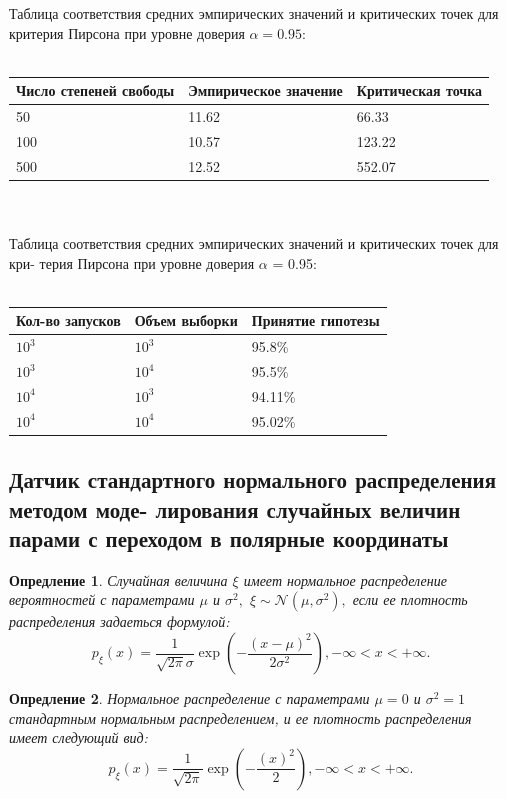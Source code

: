 \documentclass[11pt]{article}
\newtheorem{definition}{Опредление}
\numberwithin{equation}{section}
\begin{document}
Таблица соответствия средних эмпирических значений и критических точек для критерия Пирсона при уровне доверия $\alpha = 0.95$:
\\
\\
\begin{tabular}{ | l | l | l | }
  \hline
  Число степеней свободы & Эмпирическое значение & Критическая точка\\ \hline
  50 & 11.62 & 66.33 \\ \hline
  100 & 10.57 & 123.22  \\ \hline
  500 & 12.52 & 552.07 \\ 
  \hline
\end{tabular}
\\
\\
Таблица соответствия средних эмпирических значений и критических точек для кри- терия Пирсона при уровне доверия $\alpha$ = 0.95:
\\
\\
\begin{tabular}{ | l | l | l | }
  \hline
  Кол-во запусков & Объем выборки & Принятие гипотезы\\ \hline
  $10^3$ & $10^3$ & 95.8\% \\ \hline
  $10^3$ & $10^4$ & 95.5\%  \\ \hline
  $10^4$ & $10^3$ & 94.11\% \\ \hline
  $10^4$ & $10^4$ & 95.02\%\\
  \hline
\end{tabular}
\subsection{Датчик стандартного нормального распределения методом моде- лирования случайных величин парами с переходом в полярные координаты}
\begin{definition}
  Случайная величина $\xi$ имеет нормальное распределение вероятностей с параметрами $\mu$ и $\sigma^2,$ $\xi \sim \mathcal{N}(\mu,\sigma^2),$
  если ее плотность распределения задаеться формулой:
  $$ p_{\xi}(x) = \frac{1}{\sqrt{2\pi}\sigma} \exp (-\frac{(x-\mu)^2}{2\sigma^2}), -\infty < x < +\infty.$$
\end{definition}

\begin{definition}
  Нормальное распределение с параметрами $\mu =0 $ и $\sigma^2 = 1$  стандартным нормальным распределением, и ее плотность распределения имеет следующий вид:
  $$ p_{\xi}(x) = \frac{1}{\sqrt{2\pi}} \exp (-\frac{(x)^2}{2}), -\infty < x < +\infty.$$
\end{definition}
\end{document}
